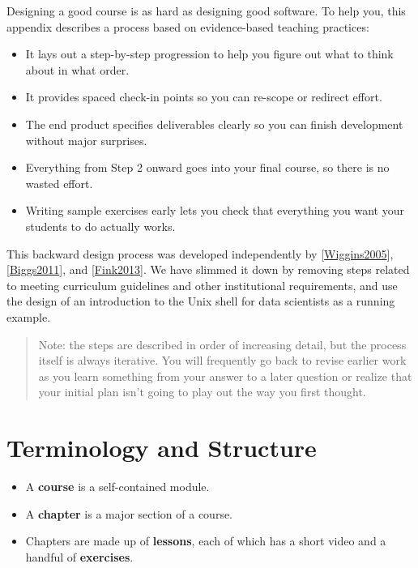 \documentclass[10pt,statementpaper]{memoir}
\providecommand{\tightlist}{%
  \setlength{\itemsep}{0pt}\setlength{\parskip}{0pt}}
\begin{document}
Designing a good course is as hard as designing good software. To help
you, this appendix describes a process based on evidence-based teaching
practices:

\begin{itemize}
\tightlist
\item
  It lays out a step-by-step progression to help you figure out what to
  think about in what order.
\item
  It provides spaced check-in points so you can re-scope or redirect
  effort.
\item
  The end product specifies deliverables clearly so you can finish
  development without major surprises.
\item
  Everything from Step 2 onward goes into your final course, so there is
  no wasted effort.
\item
  Writing sample exercises early lets you check that everything you want
  your students to do actually works.
\end{itemize}

This backward design process was developed independently by
{[}\href{biblio.html\#wiggins-mctighe}{Wiggins2005}{]},
{[}\href{biblio.html\#biggs-tang-quality}{Biggs2011}{]}, and
{[}\href{biblio.html\#fink-significant}{Fink2013}{]}. We have slimmed it
down by removing steps related to meeting curriculum guidelines and
other institutional requirements, and use the design of an introduction
to the Unix shell for data scientists as a running example.

\begin{quote}
Note: the steps are described in order of increasing detail, but the
process itself is always iterative. You will frequently go back to
revise earlier work as you learn something from your answer to a later
question or realize that your initial plan isn't going to play out the
way you first thought.
\end{quote}

\section{Terminology and Structure}\label{terminology-and-structure}

\begin{itemize}
\tightlist
\item
  A \textbf{course} is a self-contained module.
\item
  A \textbf{chapter} is a major section of a course.
\item
  Chapters are made up of \textbf{lessons}, each of which has a short
  video and a handful of \textbf{exercises}.
\end{itemize}
\end{document}
